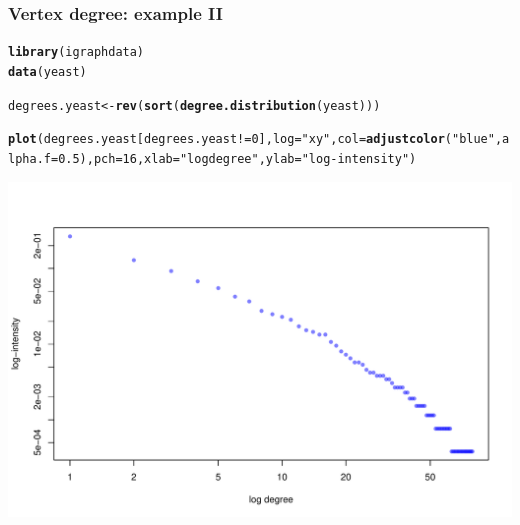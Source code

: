\documentclass{beamer}\usepackage[]{graphicx}\usepackage[]{color}
\makeatletter
\newcommand{\hlnum}[1]{\textcolor[rgb]{0.686,0.059,0.569}{#1}}%
\newcommand{\hlstr}[1]{\textcolor[rgb]{0.192,0.494,0.8}{#1}}%
\newcommand{\hlopt}[1]{\textcolor[rgb]{0,0,0}{#1}}%
\newcommand{\hlstd}[1]{\textcolor[rgb]{0.345,0.345,0.345}{#1}}%
\newcommand{\hlkwb}[1]{\textcolor[rgb]{0.69,0.353,0.396}{#1}}%
\newcommand{\hlkwc}[1]{\textcolor[rgb]{0.333,0.667,0.333}{#1}}%
\newcommand{\hlkwd}[1]{\textcolor[rgb]{0.737,0.353,0.396}{\textbf{#1}}}%
\newenvironment{kframe}{%
 \def\at@end@of@kframe{}%
 \ifinner\ifhmode%
  \def\at@end@of@kframe{\end{minipage}}%
  \begin{minipage}{\columnwidth}%
 \fi\fi%
 \def\FrameCommand##1{\hskip\@totalleftmargin \hskip-\fboxsep
 \colorbox{shadecolor}{##1}\hskip-\fboxsep
     \hskip-\linewidth \hskip-\@totalleftmargin \hskip\columnwidth}%
 \MakeFramed {\advance\hsize-\width
   \@totalleftmargin\z@ \linewidth\hsize
   \@setminipage}}%
 {\par\unskip\endMakeFramed%
 \at@end@of@kframe}
\newenvironment{knitrout}{}{} %
\makeatother
\begin{document}
\begin{frame}
  \frametitle{Vertex degree: example II}

\begin{knitrout}\scriptsize
{}\color{fgcolor}\begin{kframe}
\begin{alltt}
\hlkwd{library}\hlstd{(igraphdata)}
\hlkwd{data}\hlstd{(yeast)}

\hlstd{degrees.yeast} \hlkwb{<-} \hlkwd{rev}\hlstd{(}\hlkwd{sort}\hlstd{(}\hlkwd{degree.distribution}\hlstd{(yeast)))}

\hlkwd{plot}\hlstd{(degrees.yeast[degrees.yeast}\hlopt{!=}\hlnum{0}\hlstd{],} \hlkwc{log}\hlstd{=}\hlstr{"xy"}\hlstd{,} \hlkwc{col}\hlstd{=}\hlkwd{adjustcolor}\hlstd{(}\hlstr{"blue"}\hlstd{,} \hlkwc{alpha.f} \hlstd{=} \hlnum{0.5}\hlstd{),} \hlkwc{pch}\hlstd{=}\hlnum{16}\hlstd{,} \hlkwc{xlab}\hlstd{=}\hlstr{"log degree"}\hlstd{,} \hlkwc{ylab}\hlstd{=}\hlstr{"log-intensity"}\hlstd{)}
\end{alltt}
\end{kframe}
\includegraphics[width=.8\textwidth]{figures/degree_2-1} 

\end{knitrout}
      
\end{frame}
\end{document}
